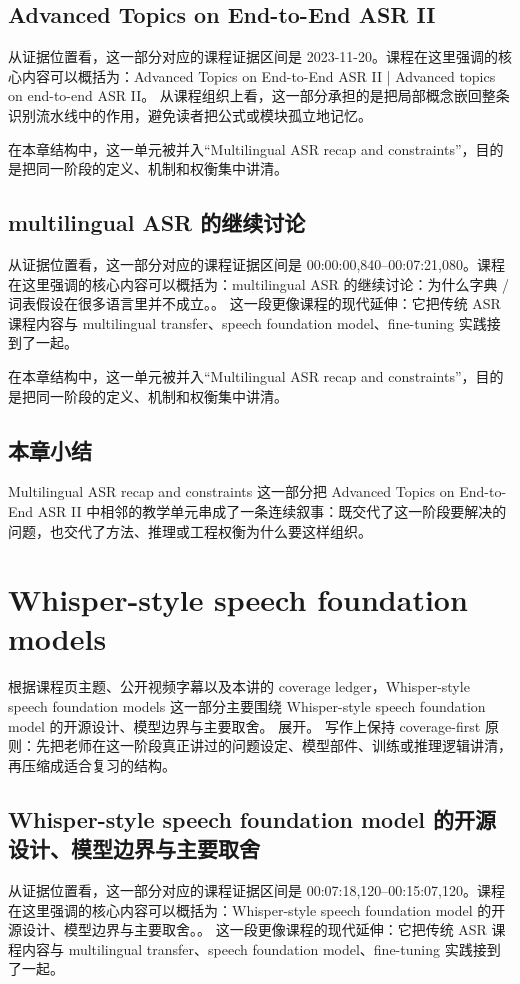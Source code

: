 \documentclass[a4paper]{article}
\begin{document}
\subsection{Advanced Topics on End-to-End ASR II}
从证据位置看，这一部分对应的课程证据区间是 2023-11-20。课程在这里强调的核心内容可以概括为：Advanced Topics on End-to-End ASR II | Advanced topics on end-to-end ASR II。
从课程组织上看，这一部分承担的是把局部概念嵌回整条识别流水线中的作用，避免读者把公式或模块孤立地记忆。

在本章结构中，这一单元被并入“Multilingual ASR recap and constraints”，目的是把同一阶段的定义、机制和权衡集中讲清。

\subsection{multilingual ASR 的继续讨论}
从证据位置看，这一部分对应的课程证据区间是 00:00:00,840--00:07:21,080。课程在这里强调的核心内容可以概括为：multilingual ASR 的继续讨论：为什么字典 / 词表假设在很多语言里并不成立。。
这一段更像课程的现代延伸：它把传统 ASR 课程内容与 multilingual transfer、speech foundation model、fine-tuning 实践接到了一起。

在本章结构中，这一单元被并入“Multilingual ASR recap and constraints”，目的是把同一阶段的定义、机制和权衡集中讲清。

\subsection{本章小结}
Multilingual ASR recap and constraints 这一部分把 Advanced Topics on End-to-End ASR II 中相邻的教学单元串成了一条连续叙事：既交代了这一阶段要解决的问题，也交代了方法、推理或工程权衡为什么要这样组织。

\section{Whisper-style speech foundation models}
根据课程页主题、公开视频字幕以及本讲的 coverage ledger，Whisper-style speech foundation models 这一部分主要围绕 Whisper-style speech foundation model 的开源设计、模型边界与主要取舍。 展开。
写作上保持 coverage-first 原则：先把老师在这一阶段真正讲过的问题设定、模型部件、训练或推理逻辑讲清，再压缩成适合复习的结构。

\subsection{Whisper-style speech foundation model 的开源设计、模型边界与主要取舍}
从证据位置看，这一部分对应的课程证据区间是 00:07:18,120--00:15:07,120。课程在这里强调的核心内容可以概括为：Whisper-style speech foundation model 的开源设计、模型边界与主要取舍。。
这一段更像课程的现代延伸：它把传统 ASR 课程内容与 multilingual transfer、speech foundation model、fine-tuning 实践接到了一起。
\end{document}
